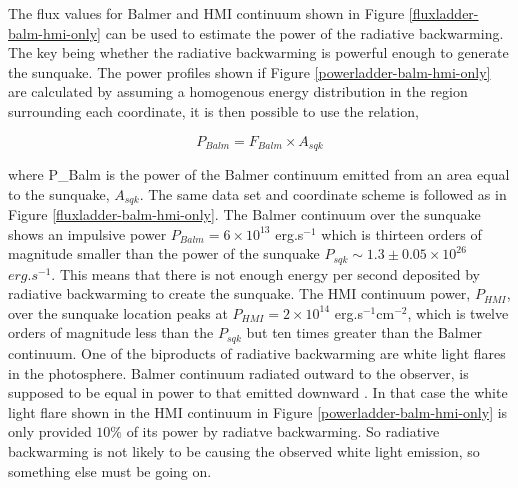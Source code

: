 The flux values for Balmer and HMI continuum shown in Figure \ref{fluxladder-balm-hmi-only} can be used to estimate the power of the radiative backwarming. The key being whether the radiative backwarming is powerful enough to generate the sunquake. The power profiles shown if Figure \ref{powerladder-balm-hmi-only} are calculated by assuming a homogenous energy distribution in the region surrounding each coordinate, it is then possible to use the relation,

\begin{equation}
P_{Balm} = F_{Balm}{\times}A_{sqk}  
\end{equation}\label{Pbalm}

where P_{Balm} is the power of the Balmer continuum emitted from an area equal to the sunquake, $A_{sqk}$. The same data set and coordinate scheme is followed as in Figure \ref{fluxladder-balm-hmi-only}. The Balmer continuum over the sunquake shows an impulsive power $P_{Balm} = 6{\times}10^{13}$ erg.s$^{-1}$ which is thirteen orders of magnitude smaller than the power of the sunquake $P_{sqk} \sim 1.3\pm0.05{\times}10^{26}$ $erg.s^{-1}$. This means that there is not enough energy per second deposited by radiative backwarming to create the sunquake. The HMI continuum power, $P_{HMI}$, over the sunquake location peaks at $P_{HMI} = 2{\times}10^{14}$ erg.s$^{-1}$cm$^{-2}$, which is twelve orders of magnitude less than the $P_{sqk}$ but ten times greater than the Balmer continuum. One of the biproducts of radiative backwarming are white light flares in the photosphere. Balmer continuum radiated outward to the observer, is supposed to be equal in power to that emitted downward \citep{1989SoPh..124..303M}. In that case the white light flare shown in the HMI continuum in Figure \ref{powerladder-balm-hmi-only} is only provided $10\percent$ of its power by radiatve backwarming. So radiative backwarming is not likely to be causing the observed white light emission, so something else must be going on. 



